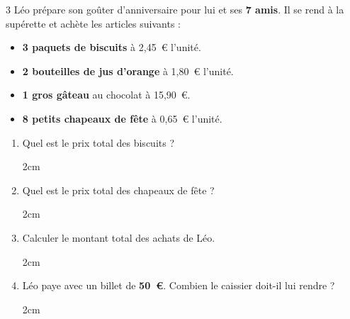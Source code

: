 \documentclass[a4paper]{book}
\begin{document}
{    \begin{exerciceNote}{3}
        Léo prépare son goûter d'anniversaire pour lui et ses \textbf{7 amis}. Il se rend à la supérette et achète les articles suivants :
        
        \begin{itemize}
            \item \textbf{3 paquets de biscuits} à 2,45~\euro{} l'unité.
            \item \textbf{2 bouteilles de jus d'orange} à 1,80~\euro{} l'unité.
            \item \textbf{1 gros gâteau} au chocolat à 15,90~\euro{}.
            \item \textbf{8 petits chapeaux de fête} à 0,65~\euro{} l'unité.
        \end{itemize}
        
        \medskip
        
        \begin{enumerate}
            \item Quel est le prix total des biscuits ? 
            
            \begin{ZoneReponse}{2cm}
            \end{ZoneReponse}


\newpage

                 
            \item Quel est le prix total des chapeaux de fête ?
            
            \begin{ZoneReponse}{2cm}
            \end{ZoneReponse}
                
            \item Calculer le montant total des achats de Léo.
            
            \begin{ZoneReponse}{2cm}
            \end{ZoneReponse}

            \item Léo paye avec un billet de \textbf{50~\euro{}}. Combien le caissier doit-il lui rendre ? \\
            \begin{ZoneReponse}{2cm}
            \end{ZoneReponse}
        \end{enumerate}
    \end{exerciceNote}


}
\end{document}

